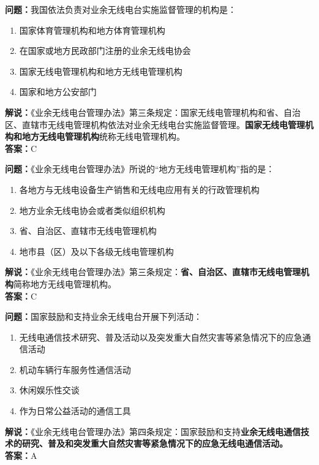 \bigskip


\noindent\textbf{问题：}我国依法负责对业余无线电台实施监督管理的机构是：
\begin{enumerate}[label=\Alph*), leftmargin=3em]
\item 国家体育管理机构和地方体育管理机构
\item 在国家或地方民政部门注册的业余无线电协会
\item 国家无线电管理机构和地方无线电管理机构
\item 国家和地方公安部门
\end{enumerate}
\noindent\textbf{解说：}《业余无线电台管理办法》第三条规定：国家无线电管理机构和省、自治区、直辖市无线电管理机构依法对业余无线电台实施监督管理。\textbf{国家无线电管理机构和地方无线电管理机构}统称无线电管理机构。\\\noindent\textbf{答案：}C

\bigskip


\noindent\textbf{问题：}《业余无线电台管理办法》所说的“地方无线电管理机构”指的是：
\begin{enumerate}[label=\Alph*), leftmargin=3em]
\item 各地方与无线电设备生产销售和无线电应用有关的行政管理机构
\item 地方业余无线电协会或者类似组织机构
\item 省、自治区、直辖市无线电管理机构
\item 地市县（区）及以下各级无线电管理机构
\end{enumerate}
\noindent\textbf{解说：}《业余无线电台管理办法》第三条规定：\textbf{省、自治区、直辖市无线电管理机构}简称地方无线电管理机构。\\\noindent\textbf{答案：}C

\bigskip


\noindent\textbf{问题：}国家鼓励和支持业余无线电台开展下列活动：
\begin{enumerate}[label=\Alph*), leftmargin=3em]
\item 无线电通信技术研究、普及活动以及突发重大自然灾害等紧急情况下的应急通信活动
\item 机动车辆行车服务性通信活动
\item 休闲娱乐性交谈
\item 作为日常公益活动的通信工具
\end{enumerate}
\noindent\textbf{解说：}《业余无线电台管理办法》第四条规定：国家鼓励和支持\textbf{业余无线电通信技术的研究、普及和突发重大自然灾害等紧急情况下的应急无线电通信活动。}\\\noindent\textbf{答案：}A

